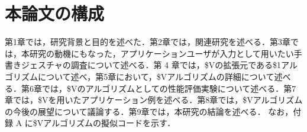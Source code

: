 \section{本論文の構成}
第1章では，研究背景と目的を述べた．第2章では，関連研究を述べる．第3章では，本研究の動機にもなった，アプリケーションユーザが入力として用いたい手書きジェスチャの調査について述べる．第 4 章では，\$Vの拡張元である\$1アルゴリズムについて述べ，第5章において，\$Vアルゴリズムの詳細について述べる．第6章では，\$Vのアルゴリズムとしての性能評価実験について述べる．第7章では，\$Vを用いたアプリケーション例を述べる．第8章では，\$Vアルゴリズムの今後の展望について議論する．第9章では，本研究の結論を述べる．
なお，付録 A に\$Vアルゴリズムの擬似コードを示す．
